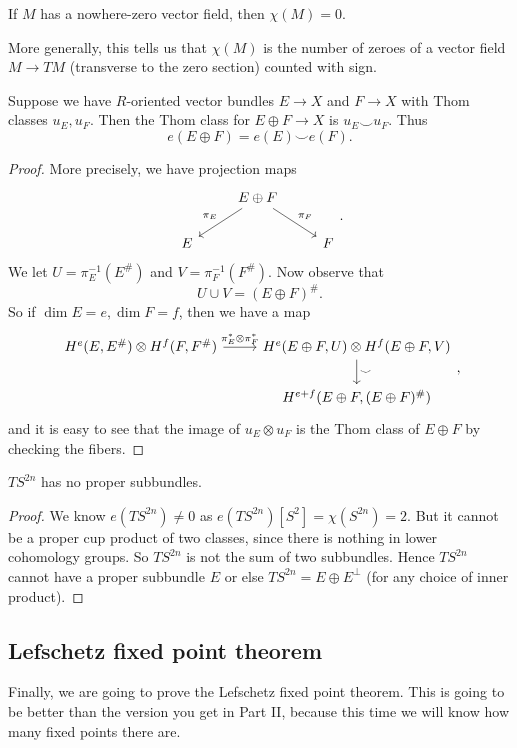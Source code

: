 \documentclass[a4paper]{article}
\begin{document}
\begin{cor}
  If $M$ has a nowhere-zero vector field, then $\chi(M) = 0$.
\end{cor}

More generally, this tells us that $\chi(M)$ is the number of zeroes of a vector field $M \to TM$ (transverse to the zero section) counted with sign.

\begin{lemma}
  Suppose we have $R$-oriented vector bundles $E \to X$ and $F \to X$ with Thom classes $u_E, u_F$. Then the Thom class for $E \oplus F \to X$ is $u_E \smile u_F$. Thus
  \[
    e(E \oplus F) = e(E) \smile e(F).
  \]
\end{lemma}

\begin{proof}
  More precisely, we have projection maps
  \[
    \begin{tikzcd}
      & E \oplus F \ar[dl, "\pi_E"'] \ar[rd, "\pi_F"]\\
      E & & F
    \end{tikzcd}.
  \]
  We let $U = \pi_E^{-1}(E^\#)$ and $V = \pi_F^{-1}(F^\#)$. Now observe that
  \[
    U \cup V = (E \oplus F)^\#.
  \]
  So if $\dim E = e, \dim F = f$, then we have a map
  \[
    \begin{tikzcd}
      H^e(E, E^\#) \otimes H^f(F, F^\#) \ar[r, "\pi_E^* \otimes \pi_F^*"] & H^e(E \oplus F, U) \otimes H^f(E \oplus F, V) \ar[d, "\smile"] \\
      & H^{e + f}(E \oplus F, (E \oplus F)^\#)
    \end{tikzcd},
  \]
  and it is easy to see that the image of $u_E \otimes u_F$ is the Thom class of $E \oplus F$ by checking the fibers.
\end{proof}

\begin{cor}
  $TS^{2n}$ has no proper subbundles.
\end{cor}

\begin{proof}
  We know $e(TS^{2n}) \not= 0$ as $e(TS^{2n})[S^2] = \chi(S^{2n}) = 2$. But it cannot be a proper cup product of two classes, since there is nothing in lower cohomology groups. So $TS^{2n}$ is not the sum of two subbundles. Hence $TS^{2n}$ cannot have a proper subbundle $E$ or else $TS^{2n} = E \oplus E^\perp$ (for any choice of inner product).
\end{proof}

\subsection{Lefschetz fixed point theorem}
Finally, we are going to prove the Lefschetz fixed point theorem. This is going to be better than the version you get in Part II, because this time we will know how many fixed points there are.
\end{document}
